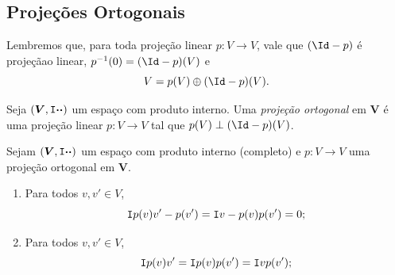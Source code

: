 \subsection{Projeções Ortogonais}

Lembremos que, para toda projeção linear $p\colon V \to V$, vale que $(\Id-p)$ é projeçãao linear, $p\inv(0) = (\Id-p)(V)$ e
	\begin{equation*}
	V = p(V) \oplus (\Id-p)(V).
	\end{equation*}

\begin{defi}
Seja $(\bm V, \mathtt I{\bm{\cdot}}{\bm{\cdot}})$ um espaço com produto interno. Uma \emph{projeção ortogonal} em $\bm V$ é uma projeção linear $p\colon V \to V$ tal que $p(V) \perp (\Id-p)(V)$.
\end{defi}

\begin{prop}
Sejam $(\bm V, \mathtt I{\bm{\cdot}}{\bm{\cdot}})$ um espaço com produto interno (completo) e $p\colon V \to V$ uma projeção ortogonal em $\bm V$.
	\begin{enumerate}
	\item Para todos $v,v' \in V$,
		\begin{equation*}
		\mathtt I{p(v)}{v' - p(v')} = \mathtt I{v-p(v)}{p(v')} = 0;
		\end{equation*}
	
	\item Para todos $v,v' \in V$,
		\begin{equation*}
		\mathtt I{p(v)}{v'} = \mathtt I{p(v)}{p(v')} = \mathtt I{v}{p(v')};
		\end{equation*}
	\end{enumerate}
\end{prop}

